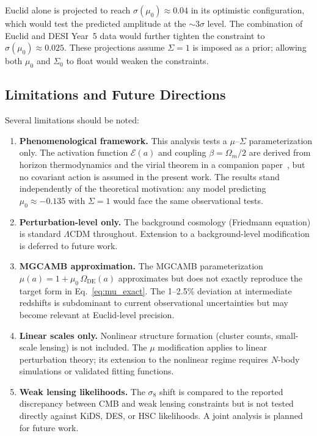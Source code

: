 \documentclass[11pt]{article}
\begin{document}
Euclid alone is projected to reach $\sigma(\mu_0) \approx 0.04$ in its optimistic configuration, which would test the predicted amplitude at the $\sim\!3\sigma$ level.
The combination of Euclid and DESI Year~5 data would further tighten the constraint to $\sigma(\mu_0) \approx 0.025$.
These projections assume $\Sigma = 1$ is imposed as a prior; allowing both $\mu_0$ and $\Sigma_0$ to float would weaken the constraints.


\subsection{Limitations and Future Directions}
\label{sec:limitations}

Several limitations should be noted:

\begin{enumerate}
\item \textbf{Phenomenological framework.} This analysis tests a $\mu$--$\Sigma$ parameterization only.
The activation function $\mathcal{E}(a)$ and coupling $\beta = \Omega_m/2$ are derived from horizon thermodynamics and the virial theorem in a companion paper~\citep{Mahaffey2026theory}, but no covariant action is assumed in the present work.
The results stand independently of the theoretical motivation: any model predicting $\mu_0 \approx -0.135$ with $\Sigma = 1$ would face the same observational tests.

\item \textbf{Perturbation-level only.}
The background cosmology (Friedmann equation) is standard $\Lambda$CDM throughout.
Extension to a background-level modification is deferred to future work.

\item \textbf{MGCAMB approximation.}
The MGCAMB parameterization $\mu(a) = 1 + \mu_0\,\Omega_\mathrm{DE}(a)$ approximates but does not exactly reproduce the target form in Eq.~\eqref{eq:mu_exact}.
The 1--2.5\% deviation at intermediate redshifts is subdominant to current observational uncertainties but may become relevant at Euclid-level precision.

\item \textbf{Linear scales only.}
Nonlinear structure formation (cluster counts, small-scale lensing) is not included.
The $\mu$ modification applies to linear perturbation theory; its extension to the nonlinear regime requires $N$-body simulations or validated fitting functions.

\item \textbf{Weak lensing likelihoods.}
The $\sigma_8$ shift is compared to the reported discrepancy between CMB and weak lensing constraints but is not tested directly against KiDS, DES, or HSC likelihoods.
A joint analysis is planned for future work.
\end{enumerate}
\end{document}
